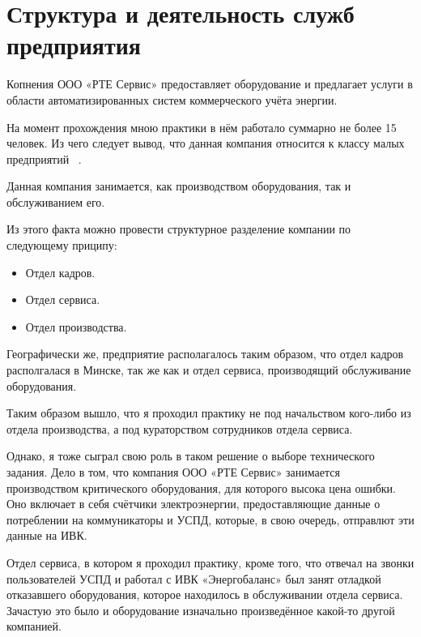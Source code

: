 \section{Структура и деятельность служб предприятия}

Копнения ООО «РТЕ Сервис» предоставляет оборудование и предлагает услуги
в области автоматизированных систем коммерческого учёта энергии.

На момент прохождения мною практики в нём работало суммарно не более 15 человек.
Из чего следует вывод,
что данная компания относится к классу малых предприятий ~\cite{mal-biznes-ru}.

Данная компания занимается, как производством оборудования,
так и обслуживанием его.

Из этого факта можно провести структурное разделение компании
по следующему приципу:
\begin{itemize}
\item Отдел кадров.
\item Отдел сервиса.
\item Отдел производства.
\end{itemize}

Географически же, предприятие располагалось таким образом,
что отдел кадров располгалася в Минске, так же как и отдел сервиса,
производящий обслуживание оборудования.

Таким образом вышло,
что я проходил практику не под начальством кого-либо из отдела производства,
а под кураторством сотрудников отдела сервиса.

Однако, я тоже сыграл свою роль в таком решение о выборе технического задания.
Дело в том, что компания ООО «РТЕ Сервис» занимается производством
критического оборудования, для которого высока цена ошибки.
Оно включает в себя счётчики электроэнергии,
предоставляющие данные о потреблении на коммуникаторы и УСПД,
которые, в свою очередь, отправлют эти данные на ИВК.

Отдел сервиса, в котором я проходил практику, кроме того,
что отвечал на звонки пользователей УСПД и работал с
ИВК «Энергобаланс» был занят отладкой отказавшего
оборудования, которое находилось в обслуживании отдела сервиса.
Зачастую это было и оборудование изначально произведённое
какой-то другой компанией.

\newpage
